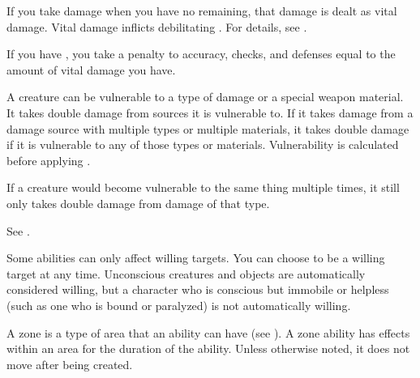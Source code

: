  If you take damage when you have no  remaining, that damage is dealt as vital damage.
Vital damage inflicts debilitating .
For details, see .

 If you have , you take a penalty to accuracy, checks, and defenses equal to the amount of vital damage you have.

 A creature can be vulnerable to a type of damage or a special weapon material.
It takes double damage from sources it is vulnerable to.
If it takes damage from a damage source with multiple types or multiple materials, it takes double damage if it is vulnerable to any of those types or materials.
Vulnerability is calculated before applying .
\par If a creature would become vulnerable to the same thing multiple times, it still only takes double damage from damage of that type.

 See .

 Some abilities can only affect willing targets. You can choose to be a willing target at any time. Unconscious creatures and objects are automatically considered willing, but a character who is conscious but immobile or helpless (such as one who is bound or paralyzed) is not automatically willing.

 A zone is a type of area that an ability can have (see ).
A zone ability has effects within an area for the duration of the ability.
Unless otherwise noted, it does not move after being created.
